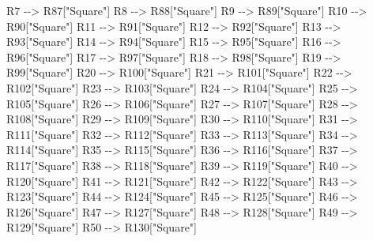 \documentclass[
]{article}
\newenvironment{Shaded}{}{}
\newcommand{\NormalTok}[1]{#1}
\begin{document}
\begin{Shaded}
\begin{Highlighting}[]
\NormalTok{        R7 {-}{-}\textgreater{} R87["Square"]}
\NormalTok{        R8 {-}{-}\textgreater{} R88["Square"]}
\NormalTok{        R9 {-}{-}\textgreater{} R89["Square"]}
\NormalTok{        R10 {-}{-}\textgreater{} R90["Square"]}
\NormalTok{        R11 {-}{-}\textgreater{} R91["Square"]}
\NormalTok{        R12 {-}{-}\textgreater{} R92["Square"]}
\NormalTok{        R13 {-}{-}\textgreater{} R93["Square"]}
\NormalTok{        R14 {-}{-}\textgreater{} R94["Square"]}
\NormalTok{        R15 {-}{-}\textgreater{} R95["Square"]}
\NormalTok{        R16 {-}{-}\textgreater{} R96["Square"]}
\NormalTok{        R17 {-}{-}\textgreater{} R97["Square"]}
\NormalTok{        R18 {-}{-}\textgreater{} R98["Square"]}
\NormalTok{        R19 {-}{-}\textgreater{} R99["Square"]}
\NormalTok{        R20 {-}{-}\textgreater{} R100["Square"]}
\NormalTok{        R21 {-}{-}\textgreater{} R101["Square"]}
\NormalTok{        R22 {-}{-}\textgreater{} R102["Square"]}
\NormalTok{        R23 {-}{-}\textgreater{} R103["Square"]}
\NormalTok{        R24 {-}{-}\textgreater{} R104["Square"]}
\NormalTok{        R25 {-}{-}\textgreater{} R105["Square"]}
\NormalTok{        R26 {-}{-}\textgreater{} R106["Square"]}
\NormalTok{        R27 {-}{-}\textgreater{} R107["Square"]}
\NormalTok{        R28 {-}{-}\textgreater{} R108["Square"]}
\NormalTok{        R29 {-}{-}\textgreater{} R109["Square"]}
\NormalTok{        R30 {-}{-}\textgreater{} R110["Square"]}
\NormalTok{        R31 {-}{-}\textgreater{} R111["Square"]}
\NormalTok{        R32 {-}{-}\textgreater{} R112["Square"]}
\NormalTok{        R33 {-}{-}\textgreater{} R113["Square"]}
\NormalTok{        R34 {-}{-}\textgreater{} R114["Square"]}
\NormalTok{        R35 {-}{-}\textgreater{} R115["Square"]}
\NormalTok{        R36 {-}{-}\textgreater{} R116["Square"]}
\NormalTok{        R37 {-}{-}\textgreater{} R117["Square"]}
\NormalTok{        R38 {-}{-}\textgreater{} R118["Square"]}
\NormalTok{        R39 {-}{-}\textgreater{} R119["Square"]}
\NormalTok{        R40 {-}{-}\textgreater{} R120["Square"]}
\NormalTok{        R41 {-}{-}\textgreater{} R121["Square"]}
\NormalTok{        R42 {-}{-}\textgreater{} R122["Square"]}
\NormalTok{        R43 {-}{-}\textgreater{} R123["Square"]}
\NormalTok{        R44 {-}{-}\textgreater{} R124["Square"]}
\NormalTok{        R45 {-}{-}\textgreater{} R125["Square"]}
\NormalTok{        R46 {-}{-}\textgreater{} R126["Square"]}
\NormalTok{        R47 {-}{-}\textgreater{} R127["Square"]}
\NormalTok{        R48 {-}{-}\textgreater{} R128["Square"]}
\NormalTok{        R49 {-}{-}\textgreater{} R129["Square"]}
\NormalTok{        R50 {-}{-}\textgreater{} R130["Square"]}

\end{Highlighting}
\end{Shaded}
\end{document}
